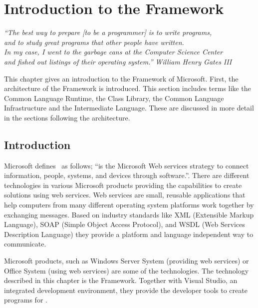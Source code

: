 \chapter{Introduction to the \dotNET Framework}
\begin{flushright}
\textit{``The best way to prepare [to be a programmer] is to write programs,}\\
\textit{and to study great programs that other people have written.}\\
\textit{In my case, I went to the garbage cans at the Computer Science Center}\\
\textit{and fished out listings of their operating system.''}
\textit{William Henry Gates III}\\
\end{flushright}

\label{chp:dotnet_platform}

This chapter gives an introduction to the \dotNET Framework of Microsoft. First, the architecture of the \dotNET Framework is introduced. This section includes terms like the Common Language Runtime, the \dotNET Class Library, the Common Language Infrastructure and the Intermediate Language. These are discussed in more detail in the sections following the architecture.

%
%
\section{Introduction}
Microsoft defines~\cite{Microsoft03-5} \dotNET as follows; ``\dotNET is the Microsoft Web services strategy to connect information, people, systems, and devices through software.''. There are different \dotNET technologies in various Microsoft products providing the capabilities to create solutions using web services. 
Web services are small, reusable applications that help computers from many different operating system platforms work together by exchanging messages. Based on industry standards like XML (Extensible Markup Language), SOAP (Simple Object Access Protocol), and WSDL (Web Services Description Language) they provide a platform and language independent way to communicate.

Microsoft products, such as Windows Server System (providing web services) or Office System (using web services) are some of the \dotNET technologies. The technology described in this chapter is the \dotNET Framework. Together with Visual Studio, an integrated development environment, they provide the developer tools to create programs for \dotNET. 

